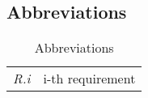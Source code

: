 \subsection{Abbreviations}

\begin{center}
\setlength\tabcolsep{7pt}
\renewcommand{\arraystretch}{2}
\begin{longtable}{|m{1.5cm}|m{8.6cm}|}
\caption{Abbreviations}\\
\hline
\endfirsthead
\endhead
\hline
\endlastfoot
\textit{R.i} & i-th requirement\\
\end{longtable}
\end{center}

\newpage